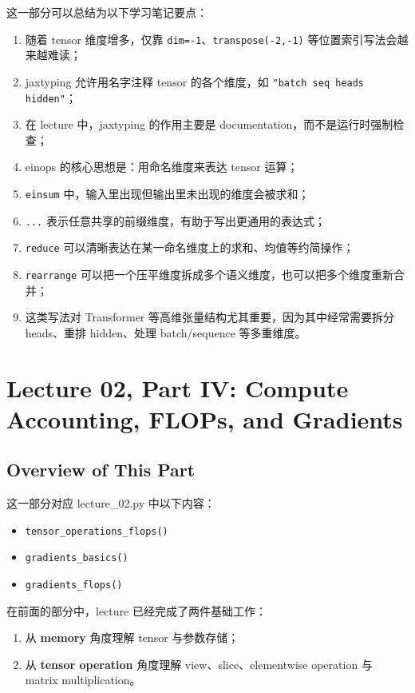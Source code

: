 \documentclass[a4paper,UTF8]{article}
\numberwithin{equation}{section}
\begin{document}
这一部分可以总结为以下学习笔记要点：

\begin{enumerate}
    \item 随着 tensor 维度增多，仅靠 \verb|dim=-1|、\verb|transpose(-2,-1)| 等位置索引写法会越来越难读；
    \item jaxtyping 允许用名字注释 tensor 的各个维度，如 \verb|"batch seq heads hidden"|；
    \item 在 lecture 中，jaxtyping 的作用主要是 documentation，而不是运行时强制检查；
    \item einops 的核心思想是：用命名维度来表达 tensor 运算；
    \item \verb|einsum| 中，输入里出现但输出里未出现的维度会被求和；
    \item \verb|...| 表示任意共享的前缀维度，有助于写出更通用的表达式；
    \item \verb|reduce| 可以清晰表达在某一命名维度上的求和、均值等约简操作；
    \item \verb|rearrange| 可以把一个压平维度拆成多个语义维度，也可以把多个维度重新合并；
    \item 这类写法对 Transformer 等高维张量结构尤其重要，因为其中经常需要拆分 heads、重排 hidden、处理 batch/sequence 等多重维度。
\end{enumerate}


\section{Lecture 02, Part IV: Compute Accounting, FLOPs, and Gradients}

\subsection{Overview of This Part}

这一部分对应 lecture\_02.py 中以下内容：
\begin{itemize}
    \item \verb|tensor_operations_flops()|
    \item \verb|gradients_basics()|
    \item \verb|gradients_flops()|
\end{itemize}

在前面的部分中，lecture 已经完成了两件基础工作：
\begin{enumerate}
    \item 从 \textbf{memory} 角度理解 tensor 与参数存储；
    \item 从 \textbf{tensor operation} 角度理解 view、slice、elementwise operation 与 matrix multiplication。
\end{enumerate}
\end{document}
